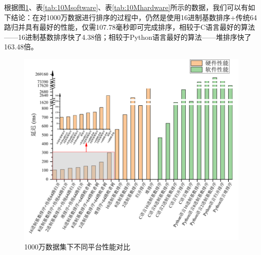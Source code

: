 
根据图\ref{fig:10MComparison}、表\ref{tab:10Msoftware}、表\ref{tab:10Mhardware}所示的数据，我们可以有如下结论：在对1000万数据进行排序的过程中，仍然是使用16进制基数排序+传统64路归并具有最好的性能，仅需107.78毫秒即可完成排序，相较于C语言最好的算法——16进制基数排序快了4.38倍；相较于Python语言最好的算法——堆排序快了163.48倍。

\begin{figure}[htbp]
    \centering
    \includegraphics[width=\linewidth]{figures/10MComparison.pdf}
    \caption{1000万数据集下不同平台性能对比}
    \label{fig:10MComparison}
\end{figure}

\begin{table}[htbp]
\centering
\caption{1000万级别数据集软件性能测试}
\label{tab:10Msoftware}
\end{table}





